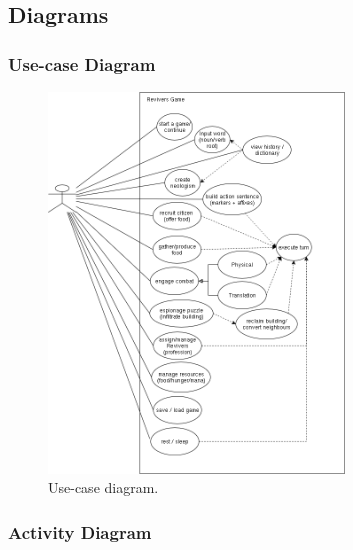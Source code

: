 \documentclass[11pt]{article}
\begin{document}
\subsection{Diagrams}
\subsubsection{Use-case Diagram}

\begin{figure}[H]
  \centering
  \includegraphics[width=0.7\textwidth]{images/usecase.png}
  \caption{Use-case diagram.}
  \label{fig:usecase}
\end{figure}

\subsubsection{Activity Diagram}
\end{document}
